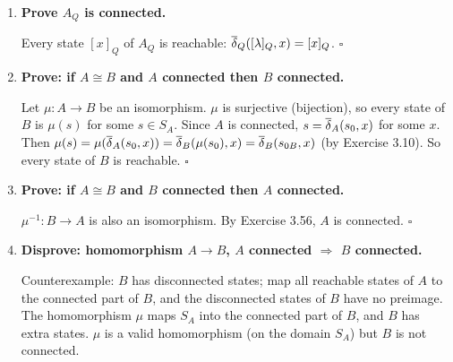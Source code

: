 \begin{enumerate}[{3.}1.]
\begin{enumerate}
\item Homomorphism $A_R\to A_Q$: Define $\mu([x]_R)=[x]_Q$ (well-defined since $R$ refines $Q$: $[x]_R=[y]_R\Rightarrow x\,R\,y\Rightarrow x\,Q\,y\Rightarrow[x]_Q=[y]_Q$). Check: $\mu(s_{0,R})=\mu([\lambda]_R)=[\lambda]_Q=s_{0,Q}$. $\mu(\delta_R([x]_R,a))=\mu([xa]_R)=[xa]_Q=\delta_Q([x]_Q,a)=\delta_Q(\mu([x]_R),a)$. $[x]_R\in F_R\Leftrightarrow x\in L\Leftrightarrow[x]_Q\in F_Q\Leftrightarrow\mu([x]_R)\in F_Q$.

\item No homomorphism $A_Q\to A_R$ in general: $A_Q$ has fewer states than $A_R$ (since $Q$ is coarser). A homomorphism would need to be injective (by Exercise 3.21 if both reduced), but an injective map from fewer to more states can't preserve structure in general.
\end{enumerate}

\item \textbf{Prove $A_Q$ is connected.}

Every state $[x]_Q$ of $A_Q$ is reachable: $\overline{\delta}_Q([\lambda]_Q,x)=[x]_Q$. $\square$

\item \textbf{Prove: if $A\cong B$ and $A$ connected then $B$ connected.}

Let $\mu: A\to B$ be an isomorphism. $\mu$ is surjective (bijection), so every state of $B$ is $\mu(s)$ for some $s\in S_A$. Since $A$ is connected, $s=\overline{\delta}_A(s_0,x)$ for some $x$. Then $\mu(s)=\mu(\overline{\delta}_A(s_0,x))=\overline{\delta}_B(\mu(s_0),x)=\overline{\delta}_B(s_{0B},x)$ (by Exercise 3.10). So every state of $B$ is reachable. $\square$

\item \textbf{Prove: if $A\cong B$ and $B$ connected then $A$ connected.}

$\mu^{-1}: B\to A$ is also an isomorphism. By Exercise 3.56, $A$ is connected. $\square$

\item \textbf{Disprove: homomorphism $A\to B$, $A$ connected $\Rightarrow$ $B$ connected.}

Counterexample: $B$ has disconnected states; map all reachable states of $A$ to the connected part of $B$, and the disconnected states of $B$ have no preimage. The homomorphism $\mu$ maps $S_A$ into the connected part of $B$, and $B$ has extra states. $\mu$ is a valid homomorphism (on the domain $S_A$) but $B$ is not connected.


\end{enumerate}
